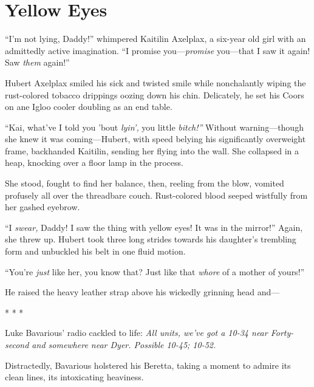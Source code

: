 \chapter{Yellow Eyes}



``I'm not lying, Daddy!'' whimpered Kaitilin Axelplax, a six-year old
girl with an admittedly active imagination. ``I promise
you---{\em promise} you---that I saw it again! Saw
{\em them} again!''



Hubert Axelplax smiled his sick and twisted smile while
nonchalantly wiping the rust-colored tobacco drippings oozing down
his chin. Delicately, he set his Coors on ane Igloo cooler doubling
as an end table.



``Kai, what've I told you 'bout {\em lyin',} you little
{\em bitch!''} Without warning---though she knew it was
coming---Hubert, with speed belying his significantly
overweight frame, backhanded Kaitilin, sending her flying into the
wall. She collapsed in a heap, knocking over a floor lamp in the
process.



She stood, fought to find her balance, then, reeling from the blow,
vomited profusely all over the threadbare couch. Rust-colored blood
seeped wistfully from her gashed eyebrow.



``I {\em swear,} Daddy! I saw the thing with yellow eyes! It was in
the mirror!'' Again, she threw up. Hubert took three long strides
towards his daughter's trembling form and unbuckled his belt in one
fluid motion.



``You're {\em just} like her, you know that? Just like that
{\em whore} of a mother of yours!''



He raised the heavy leather strap above his wickedly grinning head
and---



* * *



Luke Bavarious' radio cackled to life: {\em All units, we've got a
10-34 near Forty-second and somewhere near Dyer. Possible 10-45;
10-52.}



Distractedly, Bavarious holstered his Beretta, taking a moment to
admire its clean lines, its intoxicating heaviness.



